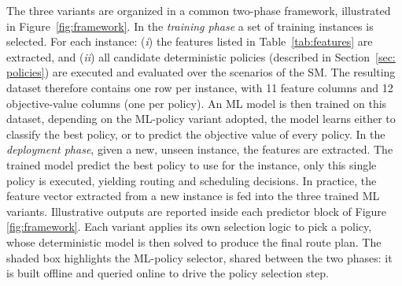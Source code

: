 \documentclass[preprint,11pt,authoryear]{elsarticle}
\begin{document}
The three variants are organized in a common two-phase framework, illustrated in Figure~\ref{fig:framework}. 
%
In the \textit{training phase} a set of training instances is selected. For each instance: (\textit{i}) the features listed in Table~\ref{tab:features} are extracted, and (\textit{ii}) all candidate deterministic policies (described in Section~\ref{sec: policies}) are executed and evaluated over the scenarios of the SM. The resulting dataset therefore contains one row per instance, with 11 feature columns and 12 objective-value columns (one per policy). An ML model is then trained on this dataset, depending on the ML-policy variant adopted, the model learns either to classify the best policy, or to predict the objective value of every policy.
In the \textit{deployment phase}, given a new, unseen instance, the features are extracted. The trained model predict the best policy to use for the instance, only this single policy is executed, yielding routing and scheduling decisions. In practice, the feature vector extracted from a new instance is fed into the three trained ML variants. Illustrative outputs are reported inside each predictor block of Figure \ref{fig:framework}. Each variant applies its own selection logic to pick a policy, whose deterministic model is then solved to produce the final route plan. The shaded box highlights the ML-policy selector, shared between the two phases: it is built offline and queried online to drive the policy selection step.
\end{document}
